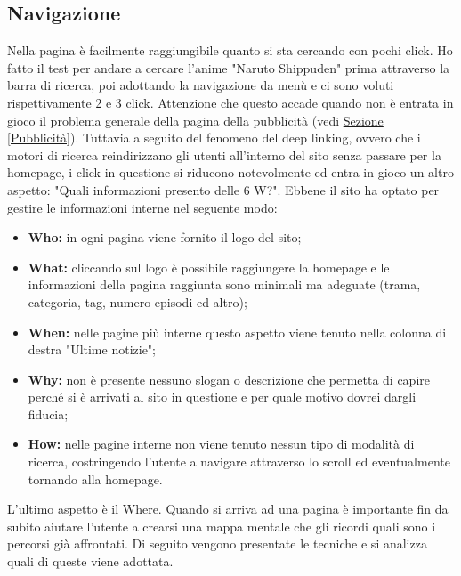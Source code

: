 \subsection{Navigazione}
Nella pagina è facilmente raggiungibile quanto si sta cercando con pochi click. Ho fatto il test per andare a cercare l'anime "Naruto Shippuden" prima attraverso la barra di ricerca, poi adottando la navigazione da menù e ci sono voluti rispettivamente 2 e 3 click. Attenzione che questo accade quando non è entrata in gioco il problema generale della pagina della pubblicità (vedi \hyperref[Pubblicità]{Sezione \ref{Pubblicità}}).
Tuttavia a seguito del fenomeno del deep linking, ovvero che i motori di ricerca reindirizzano gli utenti all'interno del sito senza passare per la homepage, i click in questione si riducono notevolmente ed entra in gioco un altro aspetto: "Quali informazioni presento delle 6 W?".
Ebbene il sito ha optato per gestire le informazioni interne nel seguente modo:
\begin{itemize}
	\item \textbf{Who:} in ogni pagina viene fornito il logo del sito;
	\item \textbf{What:} cliccando sul logo è possibile raggiungere la homepage e le informazioni della pagina raggiunta sono minimali ma adeguate (trama, categoria, tag, numero episodi ed altro);
	\item \textbf{When:} nelle pagine più interne questo aspetto viene tenuto nella colonna di destra "Ultime notizie";
	\item \textbf{Why:} non è presente nessuno slogan o descrizione che permetta di capire perché si è arrivati al sito in questione e per quale motivo dovrei dargli fiducia;
	\item \textbf{How:} nelle pagine interne non viene tenuto nessun tipo di modalità di ricerca, costringendo l'utente a navigare attraverso lo scroll ed eventualmente tornando alla homepage. 
\end{itemize}
L'ultimo aspetto è il Where. Quando si arriva ad una pagina è importante fin da subito aiutare l'utente a crearsi una mappa mentale che gli ricordi quali sono i percorsi già affrontati. Di seguito vengono presentate le tecniche e si analizza quali di queste viene adottata.

\newpage

